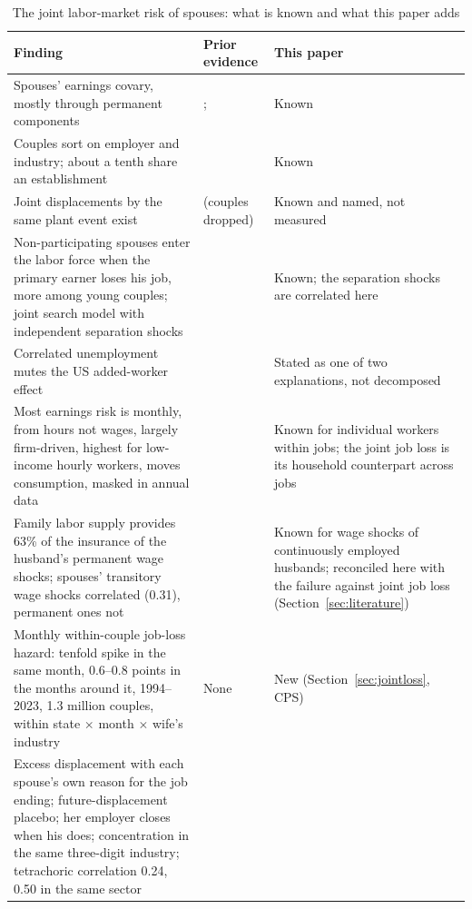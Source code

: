 \begin{table}[!htbp]\centering
\caption{The joint labor-market risk of spouses: what is known and what this paper adds}\label{tab:contribution}
\footnotesize
\begin{tabular}{p{}p{}p{}}
\toprule
Finding & Prior evidence & This paper \\
\midrule
Spouses' earnings covary, mostly through permanent components & \citet{hyslop2001rising}; \citet{shore2010better} & Known \\
\addlinespace
Couples sort on employer and industry; about a tenth share an establishment & \citet{hyatt2019coworking} & Known \\
\addlinespace
Joint displacements by the same plant event exist & \citet{halla2020job} (couples dropped) & Known and named, not measured \\
\addlinespace
Non-participating spouses enter the labor force when the primary earner loses his job, more among young couples; joint
search model with independent separation shocks & \citet{bacher2025joint} & Known; the separation shocks are correlated
here \\
\addlinespace
Correlated unemployment mutes the US added-worker effect & \citet{kawano2025who} & Stated as one of two explanations, not decomposed \\
\addlinespace
Most earnings risk is monthly, from hours not wages, largely firm-driven, highest for low-income hourly workers,
moves consumption, masked in annual data & \citet{ganong2026earnings} & Known for individual workers within jobs; the
joint job loss is its household counterpart across jobs \\
\addlinespace
Family labor supply provides 63\% of the insurance of the husband's permanent wage shocks; spouses' transitory wage
shocks correlated (0.31), permanent ones not & \citet{blundell2016consumption} & Known for wage shocks of continuously employed husbands; reconciled
here with the failure against joint job loss (Section~\ref{sec:literature}) \\
\addlinespace
Monthly within-couple job-loss hazard: tenfold spike in the same month, 0.6--0.8 points in the months around it,
1994--2023, 1.3 million couples, within state $\times$ month $\times$ wife's industry & None & New (Section~\ref{sec:jointloss},
CPS) \\
\addlinespace
Excess displacement with each spouse's own reason for the job ending; future-displacement placebo; her employer closes
when his does; concentration in the same three-digit industry; tetrachoric correlation 0.24, 0.50 in the same sector

\end{tabular}
\end{table}
